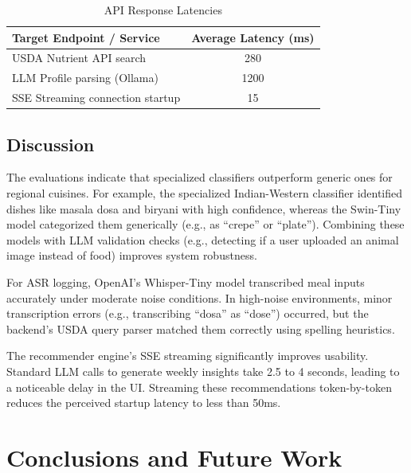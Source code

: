 \documentclass[12pt,a4paper,oneside]{report}
\begin{document}
\begin{table}[H]
    \centering
    \caption{API Response Latencies}
    \label{tab:results_api}
    \begin{tabular}{lc}
        \toprule
        \textbf{Target Endpoint / Service} & \textbf{Average Latency (ms)} \\
        \midrule
        USDA Nutrient API search & 280 \\
        LLM Profile parsing (Ollama) & 1200 \\
        SSE Streaming connection startup & 15 \\
        \bottomrule
    \end{tabular}
\end{table}

\section{Discussion}
The evaluations indicate that specialized classifiers outperform generic ones for regional cuisines. For example, the specialized Indian-Western classifier identified dishes like masala dosa and biryani with high confidence, whereas the Swin-Tiny model categorized them generically (e.g., as ``crepe'' or ``plate''). Combining these models with LLM validation checks (e.g., detecting if a user uploaded an animal image instead of food) improves system robustness.

For ASR logging, OpenAI's Whisper-Tiny model transcribed meal inputs accurately under moderate noise conditions. In high-noise environments, minor transcription errors (e.g., transcribing ``dosa'' as ``dose'') occurred, but the backend's USDA query parser matched them correctly using spelling heuristics.

The recommender engine's SSE streaming significantly improves usability. Standard LLM calls to generate weekly insights take 2.5 to 4 seconds, leading to a noticeable delay in the UI. Streaming these recommendations token-by-token reduces the perceived startup latency to less than 50ms.


\chapter{Conclusions and Future Work}
\label{ch:conclusions}
\end{document}
